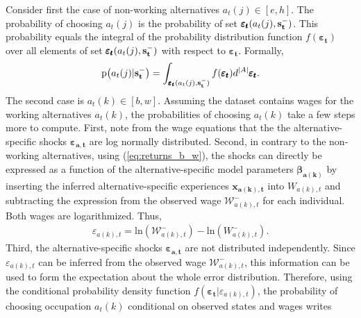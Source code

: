 Consider first the case of non-working alternatives $a_t(j) \in [e,h]$. The probability of choosing $a_t(j)$ is the probability of set $\pmb{\varepsilon_t}(a_t(j),\bold{s_t^-})$. This probability equals the integral of the probability distribution function $f(\pmb{\varepsilon_t})$ over all elements of set $\pmb{\varepsilon_t}(a_t(j),\bold{s_t^-})$ with respect to $\pmb{\varepsilon_t}$. Formally,
\begin{align}
\text{p}\big(a_t(j) | \bold{s_t^-}\big) = \int_{\pmb{\varepsilon_t}(a_t(j),\bold{s_t^-})} f(\pmb{\varepsilon_t}) d^{|A|} \pmb{\varepsilon_t}.
\end{align}
\noindent
The second case is $a_t(k) \in [b,w]$. Assuming the dataset contains wages for the working alternatives $a_t(k)$, the probabilities of choosing $a_t(k)$ take a few steps more to compute. First, note from the wage equations that the the alternative-specific shocks $\pmb{\varepsilon_{a,t}}$ are log normally distributed. Second, in contrary to the non-working alternatives, using (\ref{eq:returns_b_w}), the shocks can directly be expressed as a function of the alternative-specific model parameters $\pmb{\beta_{a(k)}}$ by inserting the inferred alternative-specific experiences $\pmb{x_{a(k),t}}$ into $W_{a(k),t}$ and subtracting the expression from the observed wage $\mathcal{W}^{-}_{a(k),t}$ for each individual. Both wages are logarithmized. Thus,
\begin{align} \label{eq:epsilon}
\varepsilon_{a(k),t} = \text{ln}(\mathcal{W}^{-}_{a(k),t}) - \text{ln}(W_{a(k),t}^{-}).
\end{align}
Third, the alternative-specific shocks $\pmb{\varepsilon_{a,t}}$ are not distributed independently. Since $\varepsilon_{a(k),t}$ can be inferred from the
observed wage $\mathcal{W}^{-}_{a(k),t}$, this information can be used to form the expectation about the whole error distribution. Therefore, using the conditional probability density function $f(\pmb{\varepsilon_t}|\varepsilon_{a(k),t})$, the probability of choosing occupation $a_t(k)$ conditional on observed states and wages writes

